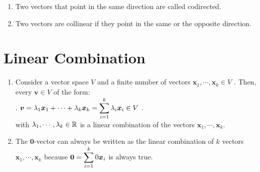 \begin{enumerate}
    \item
    \begin{definition}[Codirection]
        Two vectors that point in the same direction are called codirected.
        \hfill \cite{mfml/book/mml/Deisenroth-Faisal-Ong}
    \end{definition}

    \item
    \begin{definition}[Collinearity]
        Two vectors are collinear if they point in the same or the opposite direction.
        \hfill \cite{mfml/book/mml/Deisenroth-Faisal-Ong}
    \end{definition}
\end{enumerate}
















\section{Linear Combination}

\begin{enumerate}
    \item
    \begin{definition}
        Consider a vector space $V$ and a finite number of vectors $\bm{x}_1, \cdots , \bm{x}_k \in V$ .
        Then, every $\bm{v} \in V$ of the form:
        \\
        .\hfill
        $
            \bm{v}
            = \lambda _1 \bm{x}_1 + \cdots + \lambda _k \bm{x}_k
            = \displaystyle\sum_{i=1}^k \lambda _i \bm{x}_i
            \in V
        $
        \hfill.
        \\
        with $\lambda _1, \cdots , \lambda _k \in \mathbb{R}$ is a linear combination of the vectors $\bm{x}_1, \cdots , \bm{x}_k$.
        \hfill \cite{mfml/book/mml/Deisenroth-Faisal-Ong}
    \end{definition}

    \item The $\bm{0}$-vector can always be written as the linear combination of $k$ vectors $\bm{x}_1, \cdots , \bm{x}_k$ because $\bm{0} = \displaystyle\sum ^k _{i=1} 0 \bm{x}_i$ is always true.
    \hfill \cite{mfml/book/mml/Deisenroth-Faisal-Ong}


\end{enumerate}







